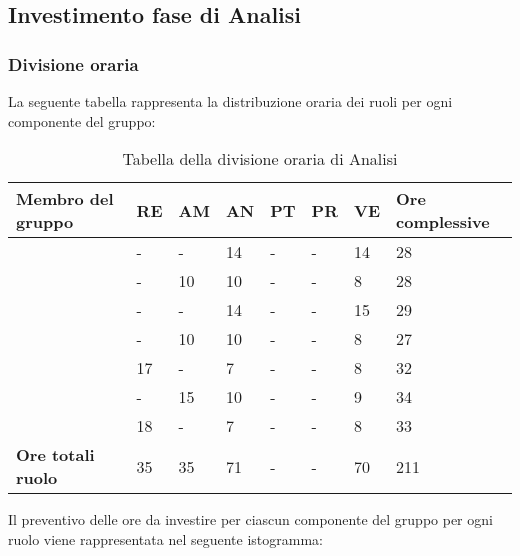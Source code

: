 \subsection{Investimento fase di Analisi}

\subsubsection{Divisione oraria}
La seguente tabella rappresenta la distribuzione oraria dei ruoli per ogni componente del gruppo:
{

\renewcommand{\arraystretch}{2}
\begin{longtable}[h!] { C{4cm} C{1cm} C{1cm} C{1cm} C{1cm} C{1cm} C{1cm} C{3cm}}
\caption{Tabella della divisione oraria di Analisi}	\\
\rowcolor{\primaryColor}

\textcolor{\secondaryColor}{\textbf{Membro del gruppo}} & 
\textcolor{\secondaryColor}{\textbf{RE}} & 
\textcolor{\secondaryColor}{\textbf{AM}} & 
\textcolor{\secondaryColor}{\textbf{AN}} & 
\textcolor{\secondaryColor}{\textbf{PT}} & 
\textcolor{\secondaryColor}{\textbf{PR}} & 
\textcolor{\secondaryColor}{\textbf{VE}} & 
\textcolor{\secondaryColor}{\textbf{Ore complessive}}\\	
\endhead
\AW{}                     &  - &  - &  14 & - & - & 14 & 28 \\
\AT{}                     &  - &  10 & 10 & - & - & 8 & 28 \\
\AD{}                     &  - &  - &  14 & - & - & 15 & 29 \\
\EC{}                     &  - &  10 & 10 & - & - & 8 & 27 \\
\EM{}                     &  17 &  - & 7 & - & - & 8 & 32 \\
\FP{}                     &  - &  15 & 10 & - & - & 9 & 34 \\
\GG{}                     & 18 &  - &  7 & - & - & 8 & 33 \\
\textbf{Ore totali ruolo} & 35 & 35 & 71 & - & - & 70 & 211 \\

\end{longtable}
}
Il preventivo delle ore da investire per ciascun componente del gruppo per ogni ruolo viene rappresentata nel seguente istogramma:
